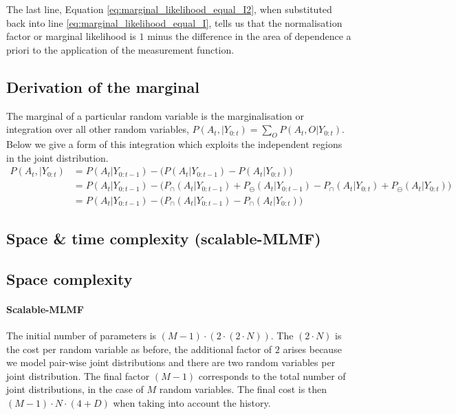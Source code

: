 \documentclass[review]{elsarticle}
\numberwithin{equation}{section}
\begin{document}
The last line, Equation \ref{eq:marginal_likelihood_equal_I2}, when substituted back into line \ref{eq:marginal_likelihood_equal_I}, tells us that the normalisation factor or marginal likelihood is $1$ minus the difference in the area of
dependence a priori to the application of the measurement function.

\subsection{Derivation of the marginal}\label{appendix:marginal}

The marginal of a particular random variable is the marginalisation or integration over all other random variables, $P(A_t,|Y_{0:t}) = \sum\limits_{O} P(A_t,O|Y_{0:t})$. Below 
we give a form of this integration which exploits the independent regions in the joint distribution.
\begin{align}
 P(A_t,|Y_{0:t}) &= P(A_t|Y_{0:t-1}) - \Big(P(A_t|Y_{0:t-1}) - P(A_t|Y_{0:t}) \Big)  \\ 
		  &=  P(A_t|Y_{0:t-1}) - \Big(P_{\cap}(A_t|Y_{0:t-1}) + P_{\ominus}(A_t|Y_{0:t-1}) -  P_{\cap}(A_t|Y_{0:t}) + P_{\ominus}(A_t|Y_{0:t})   \Big) \label{eq:dependence1} \\
		  &=  P(A_t|Y_{0:t-1}) - \Big(P_{\cap}(A_t|Y_{0:t-1}) -  P_{\cap}(A_t|Y_{0:t})  \Big) \label{eq:dependence2} 
\end{align}


\subsection{Space \& time complexity (scalable-MLMF)}\label{appendix:space_time_scalable_mlmf}


\subsection{Space complexity}

\paragraph{Scalable-MLMF}
The initial number of parameters is $\left(M - 1\right) \cdot \left(2 \cdot (2 \cdot N)\right)$. The $(2 \cdot N)$ is the cost per random variable
as before, the additional factor of $2$ arises because we model pair-wise joint distributions and there are two random variables per joint distribution. The final
factor $\left(M - 1\right)$ corresponds to the total number of joint distributions, in the case of $M$ random variables. The final cost is then 
$(M - 1) \cdot N \cdot \left(4 + D\right)$ when taking into account the history.
\end{document}
